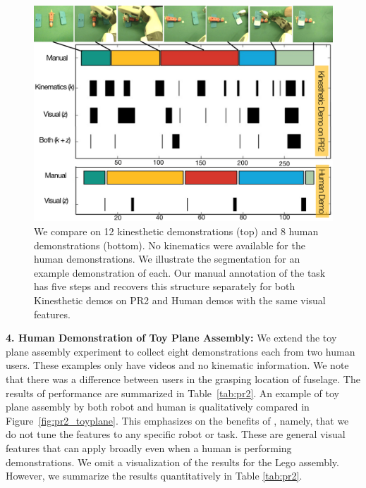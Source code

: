 \begin{figure}[!t]
\centering
\includegraphics[width=\linewidth]{tsc-experiments/pr2_plane_assembly-v5}
\caption{We compare \tsc on 12 kinesthetic demonstrations (top) and
8 human demonstrations (bottom).
No kinematics were available for the human demonstrations.
We illustrate the segmentation for an example demonstration of each.
Our manual annotation of the task has five steps and \tsc recovers this structure separately for both Kinesthetic demos on PR2 and Human demos with the same visual features. }
\vspace{-20pt}
\end{figure}

\vspace{5pt}
\noindent \textbf{4. Human Demonstration of Toy Plane Assembly: }
We extend the toy plane assembly experiment to collect eight demonstrations each from two human users. These examples only have videos and no kinematic information. We note that there was a difference between users in the grasping location of fuselage. 
The results of \tsc performance are summarized in Table~\ref{tab:pr2}.
An example of toy plane assembly by both robot and human is qualitatively compared in Figure~\ref{fig:pr2_toyplane}. 
This emphasizes on the benefits of \tsc, namely, that we do not tune the features to any specific robot or task. 
These are general visual features that can apply broadly even when a human is performing demonstrations.
We omit a visualization of the results for the Lego assembly. However, we summarize the results quantitatively in Table \ref{tab:pr2}.

